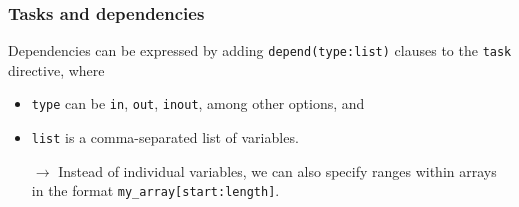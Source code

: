\documentclass[12pt,t]{beamer}
\newcommand{\conclude}[1]{%
  \begin{itemize}
    \item[$\rightarrow$]#1
  \end{itemize}
}
\begin{document}
  \begin{frame}[fragile]
    \frametitle{Tasks and dependencies}

    Dependencies can be expressed by adding \texttt{depend(type:list)} clauses to the \texttt{task} directive, where
    \begin{itemize}
      \item \texttt{type} can be \texttt{in}, \texttt{out}, \texttt{inout}, among other options, and
      \item \texttt{list} is a comma-separated list of variables.
    \end{itemize}
    \conclude{Instead of individual variables, we can also specify ranges within arrays in the format \texttt{my\_array[start:length]}.}
  \end{frame}
\end{document}
